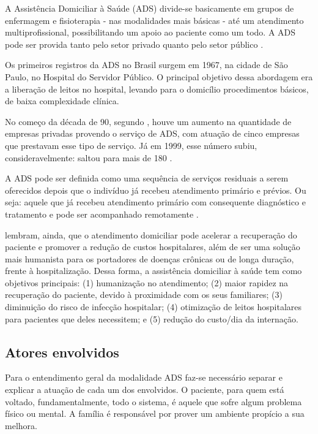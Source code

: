 A Assistência Domiciliar à Saúde (ADS) divide-se basicamente em grupos de
enfermagem e fisioterapia - nas modalidades mais básicas - até um atendimento
multiprofissional, possibilitando um apoio ao paciente como um todo. A ADS pode
ser provida tanto pelo setor privado quanto pelo setor público
\cite{amaral2001assistencia}.

Os primeiros registros da ADS no Brasil surgem em 1967, na cidade de São
Paulo, no Hospital do Servidor Público. O principal objetivo dessa abordagem
era a liberação de leitos no hospital, levando para o domicílio procedimentos
básicos, de baixa complexidade clínica.

No começo da década de 90, segundo ,
houve um aumento na quantidade de empresas privadas provendo o serviço de ADS,
com atuação de cinco empresas que prestavam esse tipo de  serviço. Já em 1999,
esse número subiu, consideravelmente: saltou para mais de 180
\cite{tavolari2000desenvolvimento}.

A ADS pode ser definida como uma sequência de serviços
residuais a serem oferecidos depois que o indivíduo já recebeu atendimento
primário e prévios. Ou seja: aquele que já recebeu atendimento primário com
consequente diagnóstico e tratamento e pode ser acompanhado remotamente
\cite{amaral2001assistencia} .

 lembram, ainda, que o atendimento domiciliar
pode acelerar a recuperação do  paciente e promover a redução de custos
hospitalares, além de ser uma solução mais  humanista para os portadores de
doenças crônicas ou de longa duração, frente à  hospitalização. Dessa forma, a
assistência domiciliar à saúde tem como objetivos principais: (1) humanização
no atendimento; (2) maior rapidez na recuperação do paciente, devido à
proximidade com os seus familiares; (3) diminuição do risco de infecção
hospitalar; (4) otimização de leitos hospitalares para pacientes que deles
necessitem; e (5) redução do custo/dia da internação.

\subsection{Atores envolvidos}\label{subsec:envolvidos}

Para o entendimento geral da modalidade ADS faz-se necessário separar e
explicar a atuação de cada um dos envolvidos. O paciente, para quem está
voltado, fundamentalmente, todo o sistema, é aquele que sofre algum problema
físico ou mental. A família é responsável por prover um ambiente propício a sua
melhora. 

